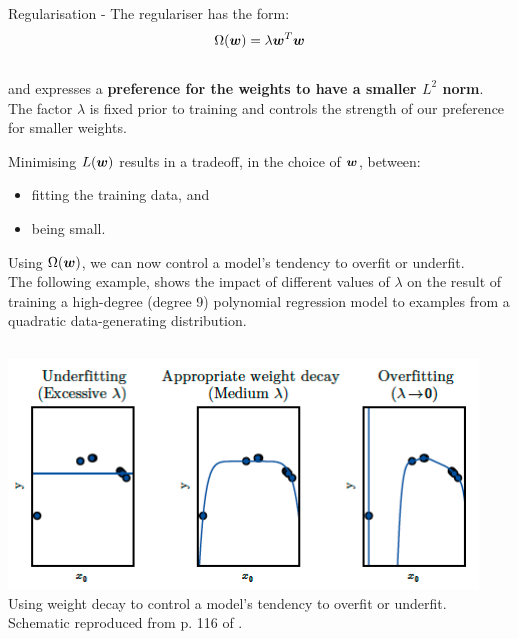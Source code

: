 \begin{frame}[t,allowframebreaks]{Regularisation -}
The \gls{regulariser} has the form:
\begin{equation}
    \Omega(\boldsymbol{w}) = \lambda \boldsymbol{w}^T \boldsymbol{w} 
\end{equation}\\

and expresses a {\bf preference for the weights to have a smaller $L^2$ norm}.
The factor $\lambda$ is fixed prior to training and controls the
strength of our preference for smaller weights.
\vspace{0.2cm}

Minimising $L(\boldsymbol{w})$ results in a tradeoff, 
in the choice of $\boldsymbol{w}$, between:
\begin{itemize}
\item fitting the training data, and
\item being small.
\end{itemize}

\framebreak

%
%

Using $\Omega(\boldsymbol{w})$, we can now control 
a model's tendency to overfit or underfit.\\
\vspace{0.2cm}
{\small
The following example, shows the impact of different values of $\lambda$ 
on the result of training a high-degree (degree 9) polynomial regression model
to examples from a quadratic data-generating distribution.\\
}

\begin{columns}
    \begin{column}{0.65\textwidth}
        \begin{center}
            \includegraphics[width=0.99\textwidth]
                {./images/training_issues/goodfellow17_regularisation_weigh_decay_example_1.png}\\
            {\tiny 
                Using weight decay to control a model's tendency to overfit or underfit.\\
                \color{col:attribution} 
                Schematic reproduced from p. 116 of \cite{Goodfellow:2017MITDL}.\\
            }
        \end{center}        
    \end{column}
    \begin{column}{0.35\textwidth}
    \end{column}
\end{columns}

\end{frame}